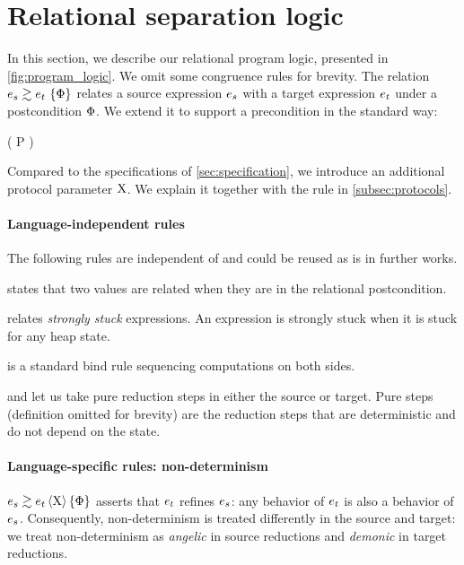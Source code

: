 \section{Relational separation logic}
\label{sec:program_logic}



In this section, we describe our relational program logic, presented in \cref{fig:program_logic}.
We omit some congruence rules for brevity.
The relation $\iSimv{\iPred}{\datalangExpr_s}{\datalangExpr_t}$ relates a source expression $\datalangExpr_s$ with a target expression $\datalangExpr_t$ under a postcondition $\Phi$.
We extend it to support a precondition in the standard way:
\begin{mathline}
    \coloneqq
    \iPersistent \left( P \iWand {} \right)
\end{mathline}
%
Compared to the specifications of \cref{sec:specification}, we introduce an additional protocol parameter $\mathrm{X}$.
We explain it together with the  rule in \cref{subsec:protocols}.

\paragraph{Language-independent rules}
The following rules are independent of \DataLang and could be reused as is in further works.

 states that two values are related when they are in the relational postcondition.

 relates \emph{strongly stuck} expressions.
An expression is strongly stuck when it is stuck for any heap state.

 is a standard bind rule sequencing computations on both sides.

 and  let us take pure reduction steps in either the source or target.
Pure steps (definition omitted for brevity) are the reduction steps that are deterministic and do not depend on the state.

\paragraph{Language-specific rules: non-determinism}
$\iSimv[\iProt]{\iPred}{\datalangExpr_s}{\datalangExpr_t}$ asserts that $\datalangExpr_t$ refines $\datalangExpr_s$: any behavior of $\datalangExpr_t$ is also a behavior of $\datalangExpr_s$.
Consequently, non-determinism is treated differently in the source and target: we treat non-determinism as \emph{angelic} in source reductions and \emph{demonic} in target reductions.

